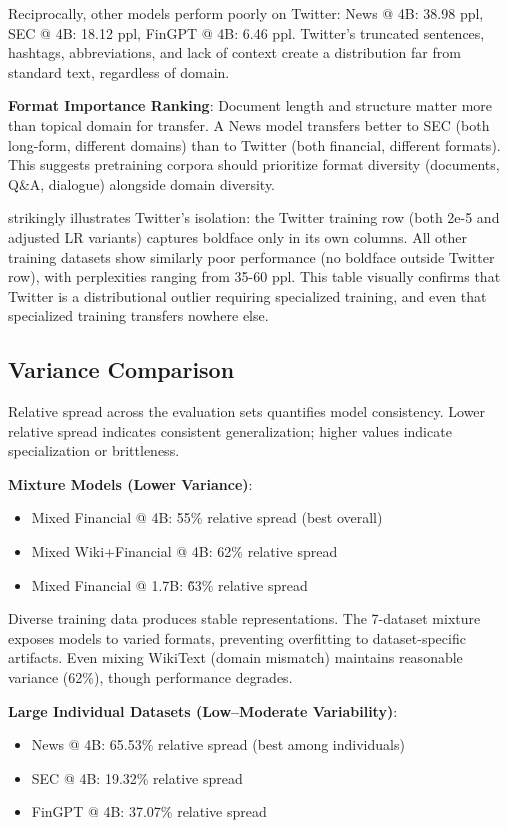 Reciprocally, other models perform poorly on Twitter: News @ 4B: 38.98 ppl, SEC @ 4B: 18.12 ppl, FinGPT @ 4B: 6.46 ppl. Twitter's truncated sentences, hashtags, abbreviations, and lack of context create a distribution far from standard text, regardless of domain.

\textbf{Format Importance Ranking}: Document length and structure matter more than topical domain for transfer. A News model transfers better to SEC (both long-form, different domains) than to Twitter (both financial, different formats). This suggests pretraining corpora should prioritize format diversity (documents, Q\&A, dialogue) alongside domain diversity.



 strikingly illustrates Twitter's isolation: the Twitter training row (both 2e-5 and adjusted LR variants) captures boldface only in its own columns. All other training datasets show similarly poor performance (no boldface outside Twitter row), with perplexities ranging from 35-60 ppl. This table visually confirms that Twitter is a distributional outlier requiring specialized training, and even that specialized training transfers nowhere else.

\subsection{Variance Comparison}

Relative spread across the evaluation sets quantifies model consistency. Lower relative spread indicates consistent generalization; higher values indicate specialization or brittleness.

\textbf{Mixture Models (Lower Variance)}:
\begin{itemize}
\item Mixed Financial @ 4B: 55\% relative spread (best overall)
\item Mixed Wiki+Financial @ 4B: 62\% relative spread
\item Mixed Financial @ 1.7B: \~63\% relative spread
\end{itemize}

Diverse training data produces stable representations. The 7-dataset mixture exposes models to varied formats, preventing overfitting to dataset-specific artifacts. Even mixing WikiText (domain mismatch) maintains reasonable variance (62\%), though performance degrades.

\textbf{Large Individual Datasets (Low–Moderate Variability)}:
\begin{itemize}
\item News @ 4B: 65.53\% relative spread (best among individuals)
\item SEC @ 4B: 19.32\% relative spread
\item FinGPT @ 4B: 37.07\% relative spread
\end{itemize}

